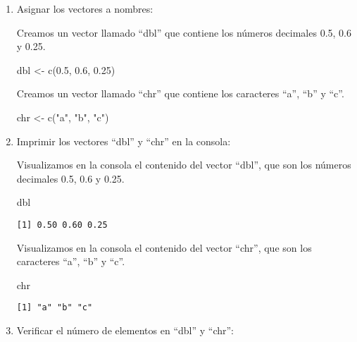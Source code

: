 \documentclass[
  a4paper,
]{article}
\newenvironment{Shaded}{}{}
\newcommand{\FloatTok}[1]{\textcolor[rgb]{0.00,0.36,0.77}{#1}}
\newcommand{\FunctionTok}[1]{\textcolor[rgb]{0.44,0.26,0.76}{#1}}
\newcommand{\NormalTok}[1]{\textcolor[rgb]{0.14,0.16,0.18}{#1}}
\newcommand{\OtherTok}[1]{\textcolor[rgb]{0.44,0.26,0.76}{#1}}
\newcommand{\StringTok}[1]{\textcolor[rgb]{0.01,0.18,0.38}{#1}}
\begin{document}
\begin{enumerate}
\def\labelenumi{\arabic{enumi}.}
\item
  Asignar los vectores a nombres:

  Creamos un vector llamado ``dbl'' que contiene los números decimales
  0.5, 0.6 y 0.25.

\begin{Shaded}
\begin{Highlighting}[]
\NormalTok{dbl }\OtherTok{\textless{}{-}} \FunctionTok{c}\NormalTok{(}\FloatTok{0.5}\NormalTok{, }\FloatTok{0.6}\NormalTok{, }\FloatTok{0.25}\NormalTok{)}
\end{Highlighting}
\end{Shaded}

  Creamos un vector llamado ``chr'' que contiene los caracteres ``a'',
  ``b'' y ``c''.

\begin{Shaded}
\begin{Highlighting}[]
\NormalTok{chr }\OtherTok{\textless{}{-}} \FunctionTok{c}\NormalTok{(}\StringTok{"a"}\NormalTok{, }\StringTok{"b"}\NormalTok{, }\StringTok{"c"}\NormalTok{)}
\end{Highlighting}
\end{Shaded}
\item
  Imprimir los vectores ``dbl'' y ``chr'' en la consola:

  Visualizamos en la consola el contenido del vector ``dbl'', que son
  los números decimales 0.5, 0.6 y 0.25.

\begin{Shaded}
\begin{Highlighting}[]
\NormalTok{dbl}
\end{Highlighting}
\end{Shaded}

\begin{verbatim}
[1] 0.50 0.60 0.25
\end{verbatim}

  Visualizamos en la consola el contenido del vector ``chr'', que son
  los caracteres ``a'', ``b'' y ``c''.

\begin{Shaded}
\begin{Highlighting}[]
\NormalTok{chr}
\end{Highlighting}
\end{Shaded}

\begin{verbatim}
[1] "a" "b" "c"
\end{verbatim}
\item
  Verificar el número de elementos en ``dbl'' y ``chr'':


\end{enumerate}
\end{document}
